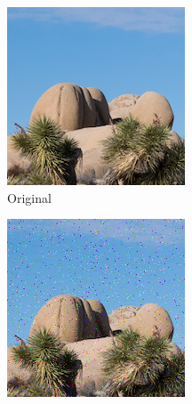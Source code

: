 \documentclass{article}
\begin{document}
\begin{figure}[htb]
    \centering
    \begin{subfigure}[b]{0.32\textwidth}
        \centering
        \includegraphics[width=\textwidth]{../Resource/cropped-image.png}
        \caption{Original}
        \label{fig:cropped-image-linear-bsc-original}
    \end{subfigure}
    \hfill
    \begin{subfigure}[b]{0.32\textwidth}
        \centering
        \includegraphics[width=\textwidth]{../Result/Linear/cropped-linear-bsc-output.png}

\end{subfigure}
\end{figure}
\end{document}
